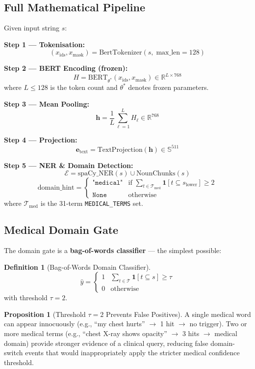 \documentclass[12pt,a4paper]{article}
\theoremstyle{definition}
\newtheorem{definition}[theorem]{Definition}
\newtheorem{proposition}[theorem]{Proposition}
\theoremstyle{remark}
\begin{document}
\subsection{Full Mathematical Pipeline}

Given input string $s$:

\textbf{Step 1 — Tokenisation:}
\[
  (x_{\text{ids}}, x_{\text{mask}}) = \text{BertTokenizer}(s,\; \text{max\_len}=128)
\]

\textbf{Step 2 — BERT Encoding (frozen):}
\[
  H = \text{BERT}_{\theta^*}(x_{\text{ids}}, x_{\text{mask}})
  \in \mathbb{R}^{L \times 768}
\]
where $L \leq 128$ is the token count and $\theta^*$ denotes frozen parameters.

\textbf{Step 3 — Mean Pooling:}
\[
  \mathbf{h} = \frac{1}{L}\sum_{\ell=1}^{L} H_\ell \in \mathbb{R}^{768}
\]

\textbf{Step 4 — Projection:}
\[
  \mathbf{e}_{\text{text}} = \text{TextProjection}(\mathbf{h}) \in \mathbb{S}^{511}
\]

\textbf{Step 5 — NER \& Domain Detection:}
\[
  \mathcal{E} = \text{spaCy\_NER}(s) \cup \text{NounChunks}(s)
\]
\[
  \text{domain\_hint} = \begin{cases}
    \texttt{"medical"} & \text{if } \displaystyle\sum_{t \in \mathcal{T}_{\text{med}}}
                         \mathbf{1}[t \subseteq s_{\text{lower}}] \geq 2 \\
    \texttt{None}      & \text{otherwise}
  \end{cases}
\]
where $\mathcal{T}_{\text{med}}$ is the 31-term \texttt{MEDICAL\_TERMS} set.

\subsection{Medical Domain Gate}

The domain gate is a \textbf{bag-of-words classifier} — the simplest possible:

\begin{definition}[Bag-of-Words Domain Classifier]
\[
  \hat{y} = \begin{cases}
    1 & \displaystyle\sum_{t \in \mathcal{T}} \mathbf{1}[t \subseteq s] \geq \tau \\
    0 & \text{otherwise}
  \end{cases}
\]
with threshold $\tau = 2$.
\end{definition}

\begin{proposition}[Threshold $\tau = 2$ Prevents False Positives]
A single medical word can appear innocuously
(e.g., ``my chest hurts'' $\to$ 1 hit $\to$ no trigger).
Two or more medical terms
(e.g., ``chest X-ray shows opacity'' $\to$ 3 hits $\to$ medical domain)
provide stronger evidence of a clinical query,
reducing false domain-switch events that would inappropriately apply the
stricter medical confidence threshold.
\end{proposition}
\end{document}
